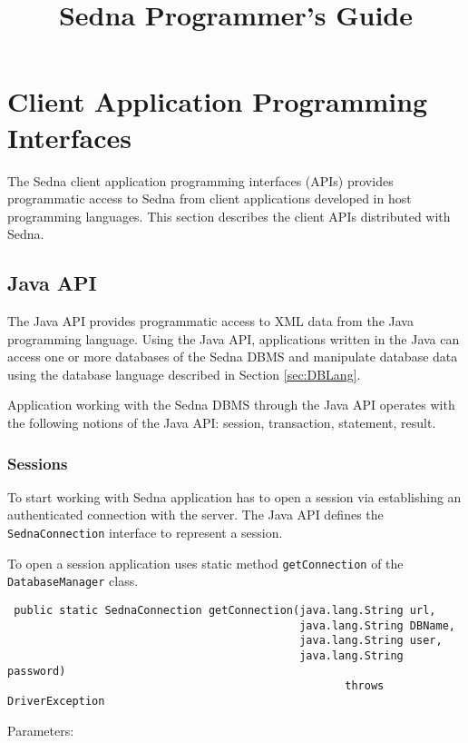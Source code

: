 \documentclass[a4paper,12pt]{article}
\title{Sedna Programmer's Guide}
\date{}
\newcommand{\TocAt}[6]{}
\begin{document}
\sloppy
\maketitle

\TocAt*{section,subsection,subsubsection}
\TocAt*{subsection,subsubsection}

\tableofcontents

\newpage

\section{Client Application Programming Interfaces}
The Sedna client application programming interfaces (APIs) provides programmatic access to Sedna from client applications developed in host programming languages. This section describes the client APIs distributed with Sedna.

\subsection{Java API}
The Java API provides programmatic access to XML data from the Java programming language. Using the Java API, applications written in the Java can access one or more databases of the Sedna DBMS and manipulate database data using the database language described in Section \ref{sec:DBLang}.

Application working with the Sedna DBMS through the Java API operates with the following notions of the Java API: session, transaction, statement, result.

\subsubsection{Sessions}
To start working with Sedna application has to open a session via establishing an authenticated connection with the server. The Java API defines the \verb!SednaConnection! interface to represent a session.

To open a session application uses static method \verb!getConnection! of the \verb!DatabaseManager! class.

\small{
\begin{verbatim}
 public static SednaConnection getConnection(java.lang.String url,
                                             java.lang.String DBName,
                                             java.lang.String user,
                                             java.lang.String password)
                                                    throws DriverException
\end{verbatim}
}
Parameters:
\end{document}
